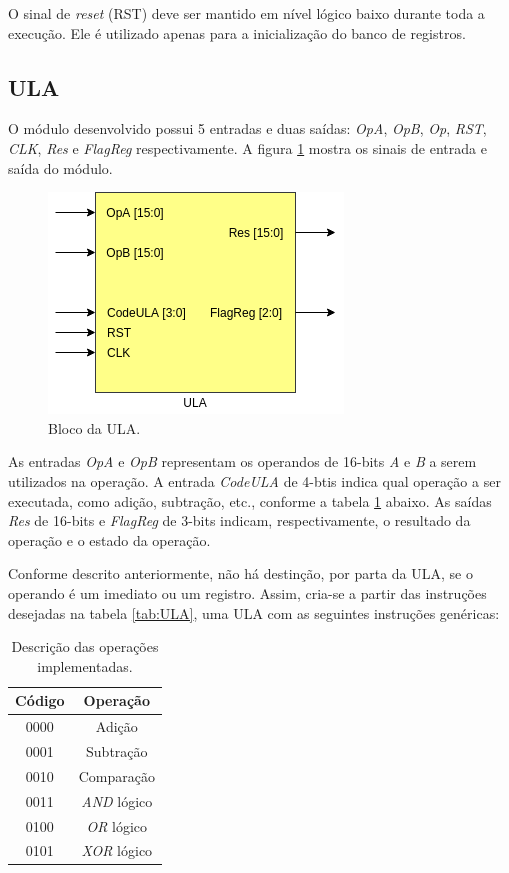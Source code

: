 \documentclass[11pt,a4paper,titlepage]{article}
\begin{document}
O sinal de \textit{reset} (RST) deve ser mantido em nível lógico baixo durante toda a execução. Ele é utilizado apenas para a inicialização do banco de registros.

\subsection{ULA}\label{subsec:imp-ula}

O módulo desenvolvido possui 5 entradas e duas saídas: \textit{OpA}, \textit{OpB}, \textit{Op}, \textit{RST}, \textit{CLK}, \textit{Res} e \textit{FlagReg} respectivamente. A figura \ref{fig:blocoula} mostra os sinais de entrada e saída do módulo.

\begin{figure}[h]
\centering
\includegraphics[scale=0.5]{images/ULA_diag.png}
\caption{Bloco da ULA.}
\label{fig:blocoula}
\end{figure}

As entradas \textit{OpA} e \textit{OpB} representam os operandos de 16-bits \textit{A} e \textit{B} a serem utilizados na operação. A entrada \textit{CodeULA} de 4-btis indica qual operação a ser executada, como adição, subtração, etc., conforme a tabela \ref{tab:imp} abaixo. As saídas \textit{Res} de 16-bits e \textit{FlagReg} de 3-bits indicam, respectivamente, o resultado da operação e o estado da operação.

Conforme descrito anteriormente, não há destinção, por parta da ULA, se o operando é um imediato ou um registro. Assim, cria-se a partir das instruções desejadas na tabela \ref{tab:ULA}, uma ULA com as seguintes instruções genéricas:

\begin{table}[h]
\centering
\begin{tabular}{| c | c |}
\hline
Código  & Operação \\
\hline
0000 & Adição\\
\hline
0001 & Subtração\\
\hline
0010 & Comparação\\
\hline
0011 & \textit{AND} lógico\\
\hline
0100 & \textit{OR} lógico\\
\hline
0101 & \textit{XOR} lógico\\
\hline
\end{tabular}
\caption{Descrição das operações implementadas.}
\label{tab:imp}
\end{table}
%
\end{document}
